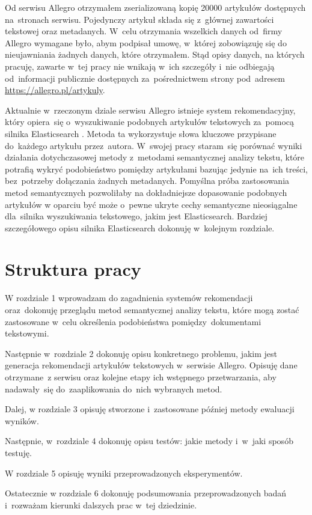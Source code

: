 \documentclass[pl]{minipw} %
\begin{document}
Od serwisu Allegro otrzymałem zserializowaną kopię 20000 artykułów dostępnych na~stronach serwisu. Pojedynczy artykuł składa się z~głównej zawartości tekstowej oraz metadanych. W~celu otrzymania wszelkich danych od~firmy Allegro wymagane było, abym podpisał umowę, w~której zobowiązuję się do nieujawniania żadnych danych, które otrzymałem. Stąd opisy danych, na których pracuję, zawarte w~tej pracy nie wnikają w~ich szczegóły i~nie odbiegają od~informacji publicznie dostępnych za~pośrednictwem strony pod~adresem \url{https://allegro.pl/artykuly}.

Aktualnie w~rzeczonym dziale serwisu Allegro istnieje system rekomendacyjny, który opiera~się o~wyszukiwanie podobnych artykułów tekstowych za~pomocą silnika Elasticsearch \cite{elastic}. Metoda ta wykorzystuje słowa kluczowe przypisane do~każdego artykułu przez~autora. W~swojej pracy staram~się porównać wyniki działania dotychczasowej metody z~metodami semantycznej analizy tekstu, które potrafią wykryć podobieństwo pomiędzy artykułami bazując jedynie na~ich treści, bez~potrzeby dołączania żadnych metadanych. Pomyślna próba zastosowania metod semantycznych pozwoliłaby na dokładniejsze dopasowanie podobnych artykułów w oparciu być może o~pewne ukryte cechy semantyczne nieosiągalne dla~silnika wyszukiwania tekstowego, jakim jest Elasticsearch. Bardziej szczegółowego opisu silnika Elasticsearch dokonuję w~kolejnym rozdziale.

\section{Struktura pracy}
W rozdziale 1 wprowadzam do zagadnienia systemów rekomendacji oraz~dokonuję przeglądu metod semantycznej analizy tekstu, które mogą zostać zastosowane w~celu określenia podobieństwa pomiędzy~dokumentami tekstowymi.

Następnie w~rozdziale 2 dokonuję opisu konkretnego problemu, jakim jest generacja rekomendacji artykułów tekstowych w~serwisie Allegro. Opisuję dane otrzymane~z serwisu oraz kolejne etapy ich wstępnego przetwarzania, aby nadawały~się do~zaaplikowania do~nich wybranych metod.

Dalej, w rozdziale 3 opisuję stworzone i~zastosowane później metody ewaluacji wyników.

Następnie, w~rozdziale 4 dokonuję opisu testów: jakie metody i~w~jaki sposób testuję.

W rozdziale 5 opisuję wyniki przeprowadzonych eksperymentów.

Ostatecznie w rozdziale 6 dokonuję podsumowania przeprowadzonych badań i~rozważam kierunki dalszych prac w~tej dziedzinie.
\end{document}

